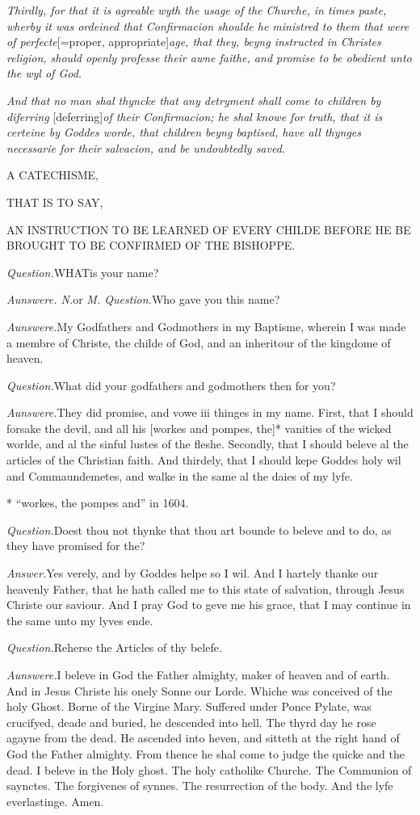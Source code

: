 \emph{Thirdly, for that it is agreable wyth the usage of the Churche, in times
paste, wherby it was ordeined that Confirmacion shoulde he ministred to
them that were of perfecte}[=proper,
appropriate]\emph{age, that they, beyng instructed
in Christes religion, should openly professe their awne faithe, and promise
to be obedient unto the wyl of God.}

\emph{And that no man shal thyncke that any detryment shall come to children
by diferring}
[deferring]\emph{of their Confirmacion; he shal knowe
for truth, that it is certeine by Goddes worde, that children beyng baptised,
have all thynges necessarie for their salvacion, and be undoubtedly saved.}

\emph{} A
CATECHISME,

THAT
IS TO SAY,

AN
INSTRUCTION TO BE LEARNED OF EVERY CHILDE BEFORE HE BE BROUGHT TO BE CONFIRMED
OF THE BISHOPPE.

\emph{Question.}WHAT\textbf{}is your name?

\emph{Aunswere. N.}or \emph{M. Question.}Who gave you this name?

\emph{Aunswere.}My Godfathers and Godmothers in my
Baptisme, wherein I was made a membre of Christe, the childe of God, and
an inheritour of the kingdome of heaven.

\emph{Question.}What did your godfathers and godmothers
then for you?

\emph{Aunswere.}They did promise, and vowe iii thinges
in my name. First, that I should forsake the devil, and all his [workes
and pompes, the]* vanities of the wicked worlde, and al the sinful lustes
of the fleshe. Secondly, that I should beleve al the articles of the Christian
faith. And thirdely, that I should kepe Goddes holy wil and Commaundemetes,
and walke in the same al the daies of my lyfe.

*
``workes, the pompes and''
in 1604.

\emph{Question.}Doest thou not thynke that thou art
bounde to beleve and to do, as they have promised for the?

\emph{Answer.}Yes verely, and by Goddes helpe so I
wil. And I hartely thanke our heavenly Father, that he hath called me
to this state of salvation, through Jesus Christe our saviour. And I pray
God to geve me his grace, that I may continue in the same unto my lyves
ende.

\emph{Question.}Reherse the Articles of thy belefe.

\emph{Aunswere.}I beleve in God the Father almighty,
maker of heaven and of earth. And in Jesus Christe his onely Sonne our
Lorde. Whiche was conceived of the holy Ghost. Borne of the Virgine Mary.
Suffered under Ponce Pylate, was crucifyed, deade and buried, he descended
into hell. The thyrd day he rose agayne from the dead. He ascended into
heven, and sitteth at the right hand of God the Father almighty. From
thence he shal come to judge the quicke and the dead. I beleve in the
Holy ghost. The holy catholike Churche. The Communion of saynctes. The
forgivenes of synnes. The resurrection of the body. And the lyfe everlastinge.
Amen.

